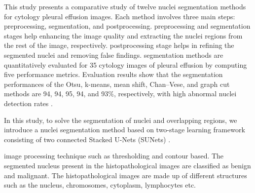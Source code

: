\documentclass[conference]{IEEEtran}
\begin{document}
This study presents a comparative study of twelve nuclei segmentation methods for cytology pleural effusion images. Each method involves three main steps: preprocessing, segmentation, and postprocessing. preprocessing and segmentation stages help enhancing the image quality and extracting the nuclei regions from the rest of the image, respectively. postprocessing stage helps in refining the segmented nuclei and removing false findings. segmentation methods are quantitatively evaluated for 35 cytology images of pleural effusion by computing five performance metrics. Evaluation results show that the segmentation performances of the Otsu, k-means, mean shift, Chan–Vese, and graph cut methods are 94, 94, 95, 94, and 93\%, respectively, with high abnormal nuclei detection rates \cite{win2018comparative}.


In this study, to solve the
segmentation of nuclei and overlapping regions, we introduce a nuclei segmentation
method based on two-stage learning framework consisting of two connected Stacked
U-Nets (SUNets) \cite{kong2020nuclear}.





image processing technique such as thresholding and contour based. The segmented nucleus present in the histopathological images are classified as  benign and malignant. The histopathological images are made up of  different structures such as the nucleus, chromosomes, cytoplasm, lymphocytes etc.
\end{document}
